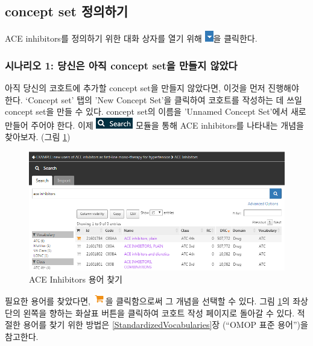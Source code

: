 \documentclass[10.5pt]{book}
\theoremstyle{definition}
\theoremstyle{definition}
\theoremstyle{definition}
\theoremstyle{remark}
\begin{document}
\subsection{concept set 정의하기}\label{concept-set-}

ACE inhibitors를 정의하기 위한 대화 상자를 열기 위해
\includegraphics{images/Cohorts/downarrow.png}을 클릭한다.

\subsubsection*{시나리오 1: 당신은 아직 concept set을 만들지
않았다}\label{-1---concept-set--}

아직 당신의 코호트에 추가할 concept set을 만들지 않았다면, 이것을 먼저
진행해야 한다. `Concept set' 탭의 'New Concept Set'을 클릭하여 코호트를
작성하는 데 쓰일 concept set을 만들 수 있다. concept set의 이름을
'Unnamed Concept Set'에서 새로 만들어 주어야 한다. 이제
\includegraphics{images/Cohorts/search-2.png} 모듈을 통해 ACE
inhibitors를 나타내는 개념을 찾아보자. (그림 \ref{fig:aceinhibitors})

\begin{figure}

{\centering \includegraphics[width=1\linewidth]{images/Cohorts/aceinhibitors} 

}

\caption{ACE Inhibitors 용어 찾기}\label{fig:aceinhibitors}
\end{figure}

필요한 용어를 찾았다면,
\includegraphics{images/Cohorts/shoppingcart.png}을 클릭함으로써 그
개념을 선택할 수 있다. 그림 \ref{fig:aceinhibitors}의 좌상단의 왼쪽을
향하는 화살표 버튼을 클릭하여 코호트 작성 페이지로 돌아갈 수 있다.
적절한 용어를 찾기 위한 방법은 \ref{StandardizedVocabularies}장 (``OMOP
표준 용어'')을 참고한다.
\end{document}
